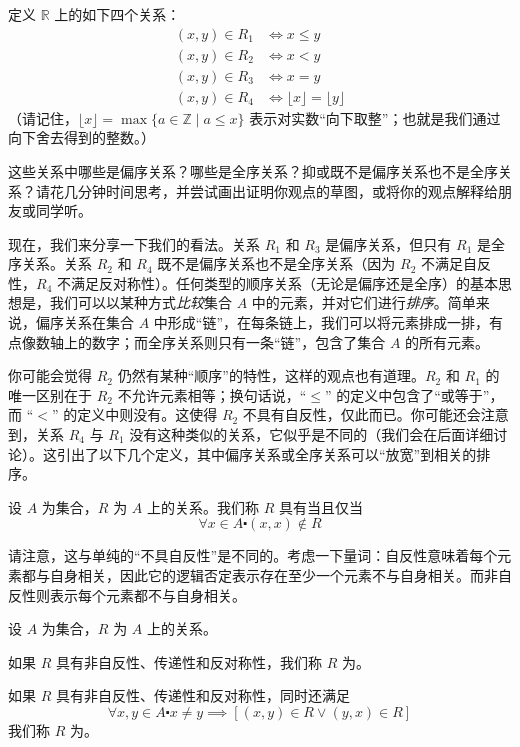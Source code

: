 \begin{example} \label{ex:example6.3.3}
    定义 $\mathbb{R}$ 上的如下四个关系：
    \begin{align*}
        (x, y) \in R_1 &\iff x \le y \\
        (x, y) \in R_2 &\iff x < y \\
        (x, y) \in R_3 &\iff x = y \\
        (x, y) \in R_4 &\iff \lfloor x \rfloor = \lfloor y \rfloor
    \end{align*}
    （请记住，$\lfloor x \rfloor = \max\{a \in \mathbb{Z} \mid a \le x\}$ 表示对实数``向下取整''；也就是我们通过向下舍去得到的整数。）

    这些关系中哪些是偏序关系？哪些是全序关系？抑或既不是偏序关系也不是全序关系？请花几分钟时间思考，并尝试画出证明你观点的草图，或将你的观点解释给朋友或同学听。

    现在，我们来分享一下我们的看法。关系 $R_1$ 和 $R_3$ 是偏序关系，但只有 $R_1$ 是全序关系。关系 $R_2$ 和 $R_4$ 既不是偏序关系也不是全序关系（因为 $R_2$ 不满足自反性，$R_4$ 不满足反对称性）。任何类型的顺序关系（无论是偏序还是全序）的基本思想是，我们可以以某种方式\emph{比较}集合 $A$ 中的元素，并对它们进行\emph{排序}。简单来说，偏序关系在集合 $A$ 中形成``链''，在每条链上，我们可以将元素排成一排，有点像数轴上的数字；而全序关系则只有一条``链''，包含了集合 $A$ 的所有元素。
\end{example}

你可能会觉得 $R_2$ 仍然有某种``顺序''的特性，这样的观点也有道理。$R_2$ 和 $R_1$ 的唯一区别在于 $R_2$ 不允许元素相等；换句话说，``$\le$'' 的定义中包含了``或等于''，而 ``$<$'' 的定义中则没有。这使得 $R_2$ 不具有自反性，仅此而已。你可能还会注意到，关系 $R_4$ 与 $R_1$ 没有这种类似的关系，它似乎是不同的（我们会在后面详细讨论）。这引出了以下几个定义，其中偏序关系或全序关系可以``放宽''到相关的排序。\\

\begin{definition}
    设 $A$ 为集合，$R$ 为 $A$ 上的关系。我们称 $R$ 具有当且仅当
    \[\forall x \in A \centerdot (x, x) \notin R\]
\end{definition}

请注意，这与单纯的``不具自反性''是不同的。考虑一下量词：自反性意味着每个元素都与自身相关，因此它的逻辑否定表示存在至少一个元素不与自身相关。而非自反性则表示每个元素都不与自身相关。\\

\begin{definition}
    设 $A$ 为集合，$R$ 为 $A$ 上的关系。
    
    如果 $R$ 具有非自反性、传递性和反对称性，我们称 $R$ 为。

    如果 $R$ 具有非自反性、传递性和反对称性，同时还满足
    \[\forall x, y \in A \centerdot x \ne y \implies [(x, y) \in R \lor (y, x) \in R]\]
    我们称 $R$ 为。
\end{definition}

